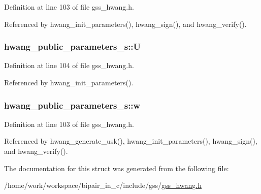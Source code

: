Definition at line 103 of file gss\-\_\-hwang.\-h.



Referenced by hwang\-\_\-init\-\_\-parameters(), hwang\-\_\-sign(), and hwang\-\_\-verify().

\hypertarget{structhwang__public__parameters__s_adfb0886d2b2b36a451e09055a4ba59ef}{
\subsubsection[{U}]{ hwang\-\_\-public\-\_\-parameters\-\_\-s\-::\-U}}\label{structhwang__public__parameters__s_adfb0886d2b2b36a451e09055a4ba59ef}


Definition at line 104 of file gss\-\_\-hwang.\-h.



Referenced by hwang\-\_\-init\-\_\-parameters().

\hypertarget{structhwang__public__parameters__s_ada4fca6c21c89063fefa888ba6768249}{
\subsubsection[{w}]{ hwang\-\_\-public\-\_\-parameters\-\_\-s\-::w}}\label{structhwang__public__parameters__s_ada4fca6c21c89063fefa888ba6768249}


Definition at line 103 of file gss\-\_\-hwang.\-h.



Referenced by hwang\-\_\-generate\-\_\-usk(), hwang\-\_\-init\-\_\-parameters(), hwang\-\_\-sign(), and hwang\-\_\-verify().



The documentation for this struct was generated from the following file\-:\begin{DoxyCompactItemize}
\item 
/home/work/workspace/bipair\-\_\-in\-\_\-c/include/gss/\hyperlink{gss__hwang_8h}{gss\-\_\-hwang.\-h}\end{DoxyCompactItemize}
